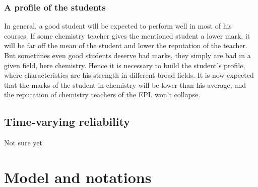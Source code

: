 \documentclass[12pt,a4paper,notitlepage]{article}
\begin{document}
\subsubsection*{A profile of the students}
In general, a good student will be expected to perform well in most of his courses. If some chemistry teacher gives the mentioned student a lower mark, it will be far off the mean of the student and lower the reputation of the teacher.\\
But sometimes even good students deserve bad marks, they simply are bad in a given field, here chemistry. Hence it is necessary to build the student's profile, where characteristics are his strength in different broad fields. It is now expected that the marks of the student in chemistry will be lower than his average, and the reputation of chemistry teachers of the EPL won't collapse.

\subsection*{Time-varying reliability}
Not sure yet

\section*{Model and notations}




\nocite{*}
\end{document}
